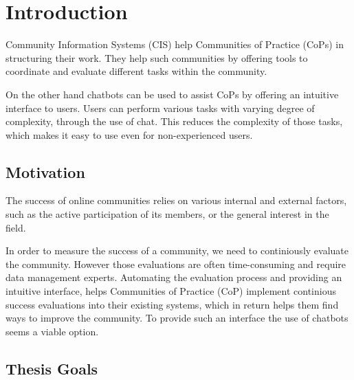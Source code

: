 \chapter{Introduction}
Community Information Systems (CIS) help Communities of Practice (CoPs) in structuring their work. They help such communities by offering tools to coordinate and evaluate different tasks within the community.

On the other hand chatbots can be used to assist CoPs by offering an intuitive interface to users. Users can perform various tasks with varying degree of complexity, through the use of chat. This reduces the complexity of those tasks, which makes it easy to use even for non-experienced users.

\section{Motivation}
The success of online communities relies on various internal and external factors, such as the active participation of its members, or the general interest in the field.

In order to measure the success of a community, we need to continiously evaluate the community. However those evaluations are often time-consuming and require data management experts. Automating the evaluation process and providing an intuitive interface, helps Communities of Practice (CoP) implement continious success evaluations into their existing systems, which in return helps them find ways to improve the community.
To provide such an interface the use of chatbots seems a viable option.

\newpage

\section{Thesis Goals}

\blankpage
